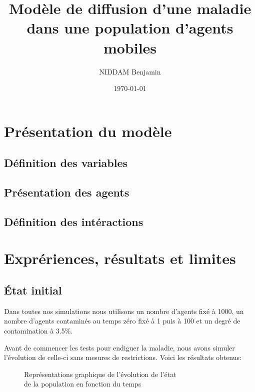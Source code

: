\documentclass[a4paper, 12pt]{article}
\title{Modèle de diffusion d'une maladie dans une population d'agents mobiles}
\author{NIDDAM Benjamin}
\date{\today}
\begin{document}
\begin{titlepage}
	\maketitle
\end{titlepage}

\newpage

\tableofcontents

\newpage

\section{Présentation du modèle}
\subsection{Définition des variables}

\subsection{Présentation des agents}

\subsection{Définition des intéractions}


\newpage
\section{Exprériences, résultats et limites}
\subsection{État initial}

Dans toutes nos simulations nous utilisons un nombre d'agents fixé à 1000, un nombre d'agents contaminés au temps zéro fixé à 1 puis à 100 et un degré de contamination à 3.5\%.

Avant de commencer les tests pour endiguer la maladie, nous avons simuler l'évolution de celle-ci sans mesures de restrictions. Voici les résultats obtenus:

\begin{figure}[!h]
	\centering
	\qquad
	\caption{Représentations graphique de l'évolution de l'état\\ de la population en fonction du temps}

\end{figure}
\end{document}
